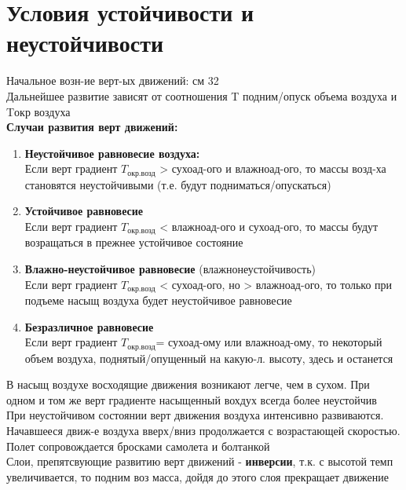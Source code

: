 
\section{Условия устойчивости и неустойчивости}
Начальное возн-ие верт-ых движений: см 32\\
Дальнейшее развитие зависят от соотношения T подним/опуск объема воздуха и Tокр воздуха\\
\textbf{Случаи развития верт движений:}
\begin{enumerate}
	\item \textbf{Неустойчивое равновесие воздуха:}\\
	Если верт градиент $T_\text{окр.возд}$ > сухоад-ого и влажноад-ого, то массы возд-ха становятся неустойчивыми (т.е. будут подниматься/опускаться)
	\item \textbf{Устойчивое равновесие}\\
	Если верт градиент $T_\text{окр.возд}$ < влажноад-ого и сухоад-ого, то массы будут возращаться в прежнее устойчивое состояние
	\item \textbf{Влажно-неустойчивое равновесие} (влажнонеустойчивость)\\
	Если верт градиент $T_\text{окр.возд}$ < сухоад-ого, но > влажноад-ого, то только при подъеме насыщ воздуха будет неустойчивое равновесие
	\item \textbf{Безразличное равновесие}\\
	Если верт градиент $T_\text{окр.возд}$= сухоад-ому или влажноад-ому, то некоторый объем воздуха, поднятый/опущенный на какую-л. высоту, здесь и останется
\end{enumerate}
В насыщ воздухе восходящие движения возникают легче, чем в сухом. При одном и том же верт градиенте насыщенный вохдух всегда более неустойчив\\
При неустойчивом состоянии верт движения воздуха интенсивно развиваются. Начавшееся движ-е воздуха вверх/вниз продолжается с возрастающей скоростью.  Полет сопровождается бросками самолета и болтанкой\\
Слои, препятсвующие развитию верт движений - \textbf{инверсии}, т.к. с высотой темп увеличивается, то подним воз масса, дойдя до этого слоя прекращает движение
